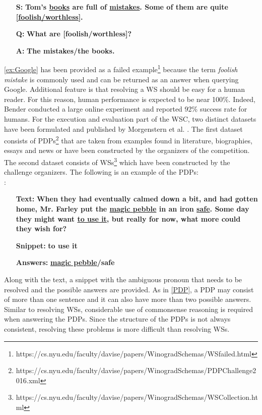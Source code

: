 \begin{itemize} 
	\item[\textbf{S:}] \textbf{Tom's \underline{books} are full of \underline{mistakes}. Some of them are quite \underline{[foolish/worthless]}.}
	\item[\textbf{Q:}] \textbf{What are [foolish/worthless]?}
	\item[\textbf{A:}] \textbf{The mistakes/the books.} 
\end{itemize} 

\ref{ex:Google} has been provided as a failed example\footnote{https://cs.nyu.edu/faculty/davise/papers/WinogradSchemas/WSfailed.html} because the term \textit{foolish mistake} is commonly used and can be returned as an answer when querying Google. Additional feature is that resolving a WS should be easy  for a human reader. For this reason, human performance is expected to be near 100\%. Indeed, Bender \cite{DBLP:conf/maics/Bender15} conducted a large online experiment and reported 92\% success rate for humans. 
For the execution and evaluation part of the WSC, two distinct datasets have been formulated and published by Morgenstern et al. \cite{DBLP:journals/aim/MorgensternDO16}.
The first dataset consists of PDPs\footnote{https://cs.nyu.edu/faculty/davise/papers/WinogradSchemas/PDPChallenge2016.xml} that are taken from examples found in literature, biographies, essays and news or have been constructed by the organizers of the competition. 
The second dataset consists of WSs\footnote{https://cs.nyu.edu/faculty/davise/papers/WinogradSchemas/WSCollection.html} which have been constructed by the challenge organizers.
The following is an example of the PDPs:\\
:

\begin{itemize}[align=left] 
	\item [\textbf{Text:}] \textbf{When they had eventually calmed down a bit, and had gotten home, Mr. Farley put the \underline{magic pebble} in an iron \underline{safe}. Some day they might want \underline{to use it}, but really for now, what more could they wish for?}
	
	\item [\textbf{Snippet:}] \textbf{to use it}
	\item [\textbf{Answers:}] \textbf{\underline{magic pebble}/safe}

\end{itemize}

Along with the text, a snippet with the ambiguous pronoun that needs to be resolved and the possible answers are provided.
As in \ref{PDP}, a PDP may consist of more than one sentence and it can also have more than two possible answers. Similar to resolving WSs, considerable use of commonsense reasoning is required when answering the PDPs. Since the structure of the PDPs is not always consistent, resolving these problems is more difficult than resolving WSs.

